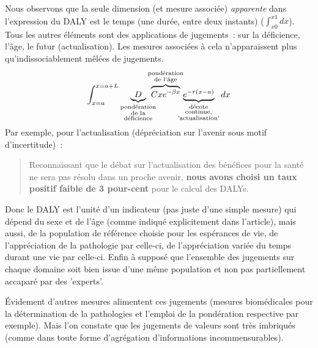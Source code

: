 Nous observons que la seule dimension (et mesure associée) \emph{apparente} dans l'expression du DALY est le temps (une durée, entre deux instants) ($\int_{x0}^{x1}dx$).
Tous les autres éléments sont des applications de jugements~: sur la déficience, l'âge, le futur (actualisation).
Les mesures associées à cela n’apparaissent plus qu’indissociablement mêlées de jugements.
\begin{equation}
\int_{x=a}^{x=a+L} \underbrace{D}_{\substack{\text{pondération}\\ \text{de la}\\\text{déficience}}} \hspace{-0.4cm} \overbrace{Cxe^{-\beta x}}^{\substack{\text{pondération}\\\text{de l'âge}}} \hspace{-0.3cm} \underbrace{e^{-r(x-a)}}_{\substack{\text{décote}\\\text{continue,}\\ \text{'actualisation'}}}dx
\label{eq:DALY}
\end{equation}
Par exemple, pour l'actualisation (dépréciation sur l'avenir sous motif d'incertitude)~: \blockcquote[traduction]{murray_quantifying_1994}{
Reconnaissant que le débat sur l'actualisation des bénéfices pour la santé ne sera pas résolu dans un proche avenir, \textbf{nous avons choisi un taux positif faible de 3 pour-cent} pour le calcul des DALYs.
}

Donc le DALY est l'unité d'un indicateur (pas juste d'une simple mesure) qui dépend du sexe et de l'âge (comme indiqué explicitement dans l'article), mais aussi, de la population de référence choisie pour les espérances de vie, de l'appréciation de la pathologie par celle-ci, de l'appréciation variée du temps durant une vie par celle-ci.
Enfin à supposé que l'ensemble des jugements sur chaque domaine soit bien issue d'une même population et non pas partiellement accaparé par des 'experts'.

Évidement d'autres mesures alimentent ces jugements (mesures biomédicales pour la détermination de la pathologies et l'emploi de la pondération respective par exemple).
Mais l'on constate que les jugements de valeurs sont très imbriqués (comme dans toute forme d'agrégation d'informations incommensurables).

